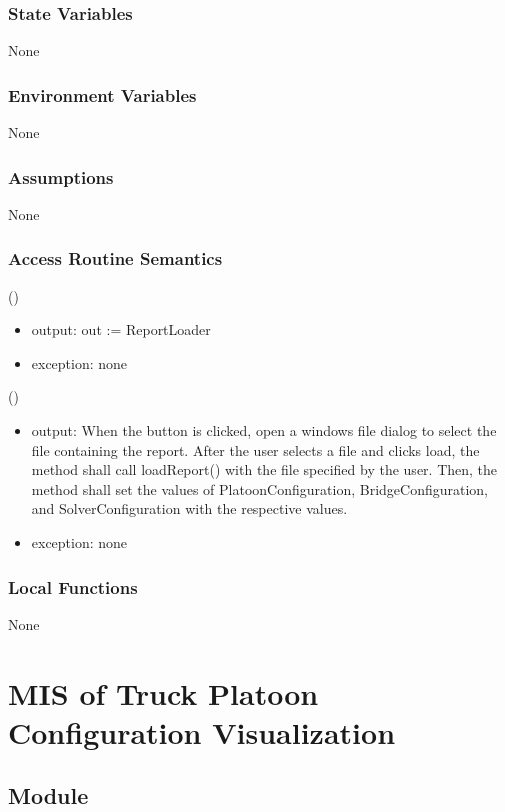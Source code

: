\documentclass[12pt, titlepage]{article}
\begin{document}
\subsubsection{State Variables}
None
\subsubsection{Environment Variables}
None
\subsubsection{Assumptions}
None
\subsubsection{Access Routine Semantics}

()
\begin{itemize}
\item output: out := ReportLoader
\item exception: none
\end{itemize}

()
\begin{itemize}
\item output: When the button is clicked, open a windows file dialog to select the file containing the report. After the user selects a file and clicks load, the method shall call loadReport() with the file specified by the user. Then, the method shall set the values of PlatoonConfiguration, BridgeConfiguration, and SolverConfiguration with the respective values.
\item exception: none
\end{itemize}

\subsubsection{Local Functions}
None
\newpage

\newpage
\section{MIS of Truck Platoon Configuration Visualization} \label{PlatoonVisualizer}

\subsection{Module}
\end{document}
